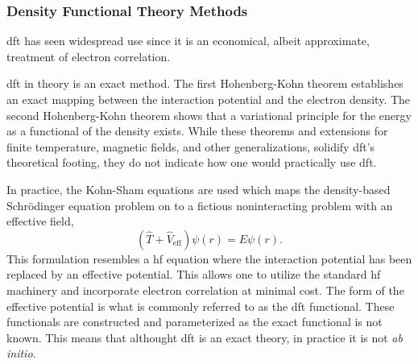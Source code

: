 \subsubsection{Density Functional Theory Methods}
\gls{dft} has seen widespread use since it is an economical, albeit approximate, treatment of electron correlation.\cite{10.1103/RevModPhys.87.897, 10.1002/qua.24259}

\gls{dft} in theory is an exact method.
The first Hohenberg-Kohn theorem establishes an exact mapping between the interaction potential and the electron density.\cite{10.1103/PhysRev.136.B864}
The second Hohenberg-Kohn theorem shows that a variational principle for the energy as a functional of the density exists.\cite{10.1103/PhysRev.136.B864}
While these theorems and extensions for finite temperature, magnetic fields, and other generalizations,\cite{10.1103/PhysRev.137.A1441, 10.1103/PhysRevLett.59.2360,10.1073/pnas.76.12.6062} solidify \gls{dft}'s theoretical footing, they do not indicate how one would practically use \gls{dft}.

In practice, the Kohn-Sham equations are used which maps the density-based Schr{\"o}dinger equation problem on to a fictious noninteracting problem with an effective field,
\begin{equation}
(\hat{T} + \hat{V}_{\mathrm{eff}}) \psi(r) = E \psi(r).
\end{equation}
This formulation resembles a \gls{hf} equation where the interaction potential has been replaced by an effective potential.
This allows one to utilize the standard \gls{hf} machinery and incorporate electron correlation at minimal cost.
The form of the effective potential is what is commonly referred to as the \gls{dft} functional.
These functionals are constructed and parameterized as the exact functional is not known.
This means that althought \gls{dft} is an exact theory, in practice it is not \textit{ab initio}.


